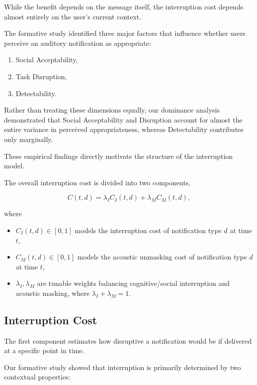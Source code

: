 While the benefit depends on the message itself, the interruption cost depends almost entirely on the user's current context.

The formative study identified three major factors that influence whether users perceive an auditory notification as appropriate:

\begin{enumerate}
    \item Social Acceptability,
    \item Task Disruption,
    \item Detectability.
\end{enumerate}

Rather than treating these dimensions equally, our dominance analysis demonstrated that Social Acceptability and Disruption account for almost the entire variance in perceived appropriateness, whereas Detectability contributes only marginally.

These empirical findings directly motivate the structure of the interruption model.

The overall interruption cost is divided into two components,

\begin{equation}
C(t,d)
=
\lambda_IC_I(t,d)
+
\lambda_MC_M(t,d),
\label{eq:cost}
\end{equation}

where

\begin{itemize}
\item $C_I(t,d) \in [0, 1]$ models the interruption cost of notification type $d$ at time $t$,
\item $C_M(t,d) \in [0, 1]$ models the acoustic unmasking cost of notification type $d$ at time $t$,
\item $\lambda_I, \lambda_M$ are tunable weights balancing cognitive/social interruption and acoustic masking, where $\lambda_I + \lambda_M = 1$.
\end{itemize}


\subsection{Interruption Cost}

The first component estimates how disruptive a notification would be if delivered at a specific point in time.

Our formative study showed that interruption is primarily determined by two contextual properties:

